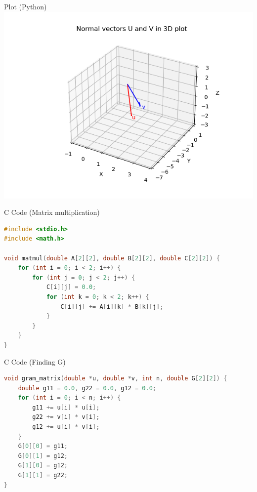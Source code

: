 \documentclass{beamer}
\begin{document}
\begin{frame}{Plot (Python)}
\centering
\includegraphics[width=1\linewidth]{figs/plt.png}
\end{frame}


\begin{frame}[fragile]{C Code (Matrix multiplication)}
\begin{lstlisting}[language=C]
#include <stdio.h>
#include <math.h>

void matmul(double A[2][2], double B[2][2], double C[2][2]) {
    for (int i = 0; i < 2; i++) {
        for (int j = 0; j < 2; j++) {
            C[i][j] = 0.0;
            for (int k = 0; k < 2; k++) {
                C[i][j] += A[i][k] * B[k][j];
            }
        }
    }
}

\end{lstlisting}
\end{frame}

\begin{frame}[fragile]{C Code (Finding G)}
\begin{lstlisting}[language=C]
void gram_matrix(double *u, double *v, int n, double G[2][2]) {
    double g11 = 0.0, g22 = 0.0, g12 = 0.0;
    for (int i = 0; i < n; i++) {
        g11 += u[i] * u[i];
        g22 += v[i] * v[i];
        g12 += u[i] * v[i];
    }
    G[0][0] = g11;
    G[0][1] = g12;
    G[1][0] = g12;
    G[1][1] = g22;
}
\end{lstlisting}
\end{frame}
\end{document}
